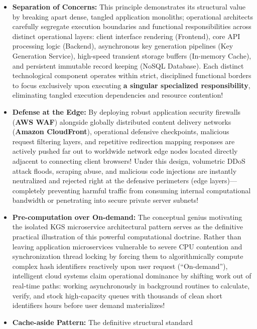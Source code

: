 \begin{itemize}
\tightlist
\item
  \textbf{Separation of Concerns:} This principle demonstrates its
  structural value by breaking apart dense, tangled application
  monoliths; operational architects carefully segregate execution
  boundaries and functional responsibilities across distinct operational
  layers: client interface rendering (Frontend), core API processing
  logic (Backend), asynchronous key generation pipelines (Key Generation
  Service), high-speed transient storage buffers (In-memory Cache), and
  persistent immutable record keeping (NoSQL Database). Each distinct
  technological component operates within strict, disciplined functional
  borders to focus exclusively upon executing \textbf{a singular
  specialized responsibility}, eliminating tangled execution
  dependencies and resource contention!
\item
  \textbf{Defense at the Edge:} By deploying robust application security
  firewalls (\textbf{AWS WAF}) alongside globally distributed content
  delivery networks (\textbf{Amazon CloudFront}), operational defensive
  checkpoints, malicious request filtering layers, and repetitive
  redirection mapping responses are actively pushed far out to worldwide
  network edge nodes located directly adjacent to connecting client
  browsers! Under this design, volumetric DDoS attack floods, scraping
  abuse, and malicious code injections are instantly neutralized and
  rejected right at the defensive perimeters (edge layers)---completely
  preventing harmful traffic from consuming internal computational
  bandwidth or penetrating into secure private server subnets!
\item
  \textbf{Pre-computation over On-demand:} The conceptual genius
  motivating the isolated KGS microservice architectural pattern serves
  as the definitive practical illustration of this powerful
  computational doctrine. Rather than leaving application microservices
  vulnerable to severe CPU contention and synchronization thread locking
  by forcing them to algorithmically compute complex hash identifiers
  reactively upon user request (``On-demand''), intelligent cloud
  systems claim operational dominance by shifting work out of real-time
  paths: working asynchronously in background routines to calculate,
  verify, and stock high-capacity queues with thousands of clean short
  identifiers hours before user demand materializes!
\item
  \textbf{Cache-aside Pattern:} The definitive structural standard

\end{itemize}
